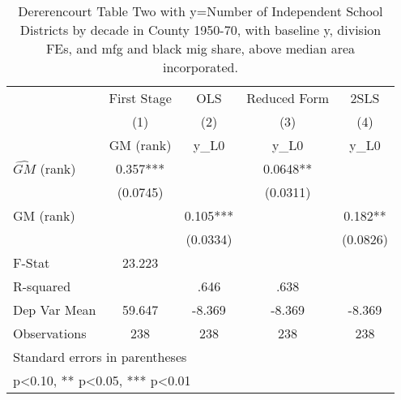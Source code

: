 \begin{table}[htbp]\centering
\def\sym#1{\ifmmode^{#1}\else\(^{#1}\)\fi}
\caption{Dererencourt Table Two with y=Number of Independent School Districts by decade in County 1950-70, with baseline y, division FEs, and mfg and black mig share, above median area incorporated.}
\begin{tabular}{l*{4}{c}}
\toprule
                    & First Stage   &         OLS   &Reduced Form   &        2SLS   \\
                    &\multicolumn{1}{c}{(1)}&\multicolumn{1}{c}{(2)}&\multicolumn{1}{c}{(3)}&\multicolumn{1}{c}{(4)}\\
                    &\multicolumn{1}{c}{GM  (rank)}&\multicolumn{1}{c}{y\_L0}&\multicolumn{1}{c}{y\_L0}&\multicolumn{1}{c}{y\_L0}\\
\midrule
$\hat{GM}$ (rank)   &       0.357***&               &      0.0648** &               \\
                    &    (0.0745)   &               &    (0.0311)   &               \\
\addlinespace
GM  (rank)          &               &       0.105***&               &       0.182** \\
                    &               &    (0.0334)   &               &    (0.0826)   \\
\midrule
F-Stat              &      23.223   &               &               &               \\
R-squared           &               &        .646   &        .638   &               \\
Dep Var Mean        &      59.647   &      -8.369   &      -8.369   &      -8.369   \\
Observations        &         238   &         238   &         238   &         238   \\
\bottomrule
\multicolumn{5}{l}{\footnotesize Standard errors in parentheses}\\
\multicolumn{5}{l}{\footnotesize * p<0.10, ** p<0.05, *** p<0.01}\\
\end{tabular}
\end{table}
